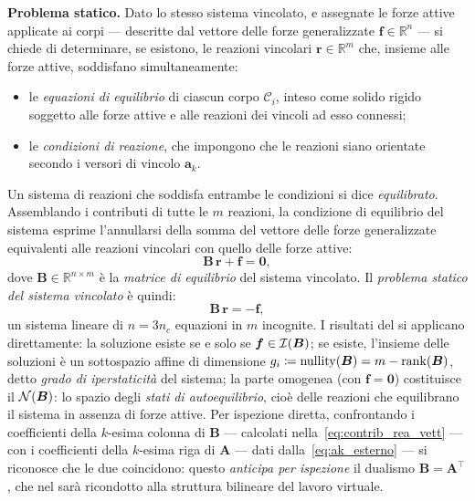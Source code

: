 \textbf{Problema statico.}
Dato lo stesso sistema vincolato, e assegnate le forze
attive applicate ai corpi --- descritte dal vettore delle
forze generalizzate $\bm{f} \in \mathbb{R}^n$ --- si
chiede di determinare, se esistono, le reazioni vincolari
$\bm{r} \in \mathbb{R}^m$ che, insieme alle forze attive,
soddisfano simultaneamente:
\begin{itemize}[noitemsep]
	\item le \emph{equazioni di equilibrio} di ciascun
	corpo $\mathcal{C}_i$, inteso come solido rigido
	soggetto alle forze attive e alle reazioni dei vincoli
	ad esso connessi;
	\item le \emph{condizioni di reazione}, che impongono
	che le reazioni siano orientate secondo i versori
	di vincolo $\bm{a}_k$.
\end{itemize}
Un sistema di reazioni che soddisfa entrambe le condizioni
si dice \emph{equilibrato}.
Assemblando i
contributi di tutte le $m$ reazioni, la condizione di
equilibrio del sistema esprime l'annullarsi della somma
del vettore delle forze generalizzate equivalenti alle
reazioni vincolari con quello delle forze attive:
\begin{equation}\label{eq:eq_globale}
	\bm{B}\,\bm{r} + \bm{f} = \bm{0},
\end{equation}
dove $\bm{B} \in \mathbb{R}^{n \times m}$ è la
\emph{matrice di equilibrio} del sistema vincolato.
Il \emph{problema statico del sistema vincolato} è quindi:
\begin{equation}\label{eq:prob_stat}
	\boxed{\bm{B}\,\bm{r} = -\bm{f},}
\end{equation}
un sistema lineare di $n = 3 n_c$ equazioni in $m$
incognite. I risultati del   si applicano
direttamente: la soluzione esiste se e solo se
$\bm{f} \in \mathcal{I}(\bm{B})$; se esiste, l'insieme delle
soluzioni è un sottospazio affine di dimensione
$g_i \coloneqq \operatorname{nullity}(\bm{B}) = m - \operatorname{rank}(\bm{B})$,
detto \emph{grado di iperstaticità} del sistema; la parte
omogenea (con $\bm{f} = \bm{0}$) costituisce il
$\mathcal{N}(\bm{B})$: lo spazio degli \emph{stati di
	autoequilibrio}, cioè delle reazioni che equilibrano il
sistema in assenza di forze attive.  Per ispezione diretta,
confrontando i coefficienti della $k$-esima colonna di
$\bm{B}$ --- calcolati nella~\eqref{eq:contrib_rea_vett}
--- con i coefficienti della $k$-esima riga di $\bm{A}$
--- dati dalla~\eqref{eq:ak_esterno} ---  si riconosce
che le due coincidono: questo \emph{anticipa per ispezione}
il dualismo $\bm{B} = \bm{A}^{\top}$, che nel 
sarà ricondotto alla struttura bilineare del lavoro virtuale.



